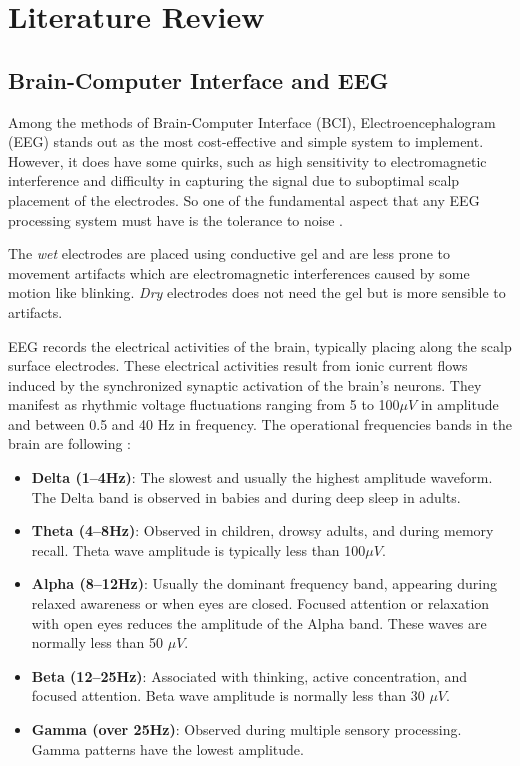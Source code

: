 \section{Literature Review}
	\label{sec:revBibli}
	
	\subsection{Brain-Computer Interface and EEG}
		\par Among the methods of Brain-Computer Interface (BCI), Electroencephalogram (EEG) stands out as the most cost-effective and simple system to implement. However, it does have some quirks, such as high sensitivity to electromagnetic interference and difficulty in capturing the signal due to suboptimal scalp placement of the electrodes. So one of the fundamental aspect that any EEG processing system must have is the tolerance to noise \cite{JALALYBIDGOLY2020101788}.
		
		\par The \textit{wet} electrodes are placed using conductive gel and are less prone to movement artifacts which are electromagnetic interferences caused by some motion like blinking. \textit{Dry} electrodes does not need the gel but is more sensible to artifacts.
		
		\par EEG records the electrical activities of the brain, typically placing along the scalp surface electrodes. These electrical activities result from ionic current flows induced by the synchronized synaptic activation of the brain's neurons. They manifest as rhythmic voltage fluctuations ranging from 5 to 100$\mu V$ in amplitude and between 0.5 and 40 Hz in frequency\cite{JALALYBIDGOLY2020101788}. The operational frequencies bands in the brain are following \cite{sanei2021eeg}:
		
		\begin{itemize}
			\item \textbf{Delta (1–4Hz)}: The slowest and usually the highest amplitude waveform. The Delta band is observed in babies and during deep sleep in adults.
			
			\item \textbf{Theta (4–8Hz)}: Observed in children, drowsy adults, and during memory recall. Theta wave amplitude is typically less than 100$\mu V$.
			
			\item \textbf{Alpha (8–12Hz)}: Usually the dominant frequency band, appearing during relaxed awareness or when eyes are closed. Focused attention or relaxation with open eyes reduces the amplitude of the Alpha band. These waves are normally less than 50 $\mu V$.
			
			\item \textbf{Beta (12–25Hz)}: Associated with thinking, active concentration, and focused attention. Beta wave amplitude is normally less than 30 $\mu V$.
			
			\item \textbf{Gamma (over 25Hz)}: Observed during multiple sensory processing. Gamma patterns have the lowest amplitude.
		\end{itemize}

